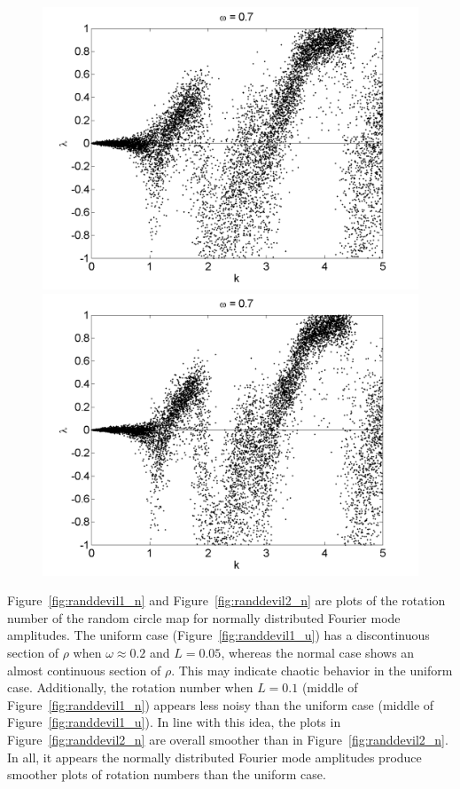 \begin{figure}[!h]
\includegraphics[width=.5\textwidth]{figs/rcirc_n_lyap_L_05_k_10000.png}\hfill
\includegraphics[width=.5\textwidth]{figs/rcirc_n_lyap_L_07_k_10000.png}\\
\end{figure}

Figure~\ref{fig:randdevil1_n} and Figure~\ref{fig:randdevil2_n} are
plots of the rotation number of the random circle map for normally
distributed Fourier mode amplitudes. The uniform case
(Figure~\ref{fig:randdevil1_u}) has a discontinuous section of $\rho$
when $\omega \approx 0.2$ and $L=0.05$, whereas the normal case shows
an almost continuous section of $\rho$. This may indicate chaotic
behavior in the uniform case. Additionally, the rotation number when
$L=0.1$ (middle of Figure~\ref{fig:randdevil1_n}) appears less noisy
than the uniform case (middle of
Figure~\ref{fig:randdevil1_u}). In line with this idea, the plots in
Figure~\ref{fig:randdevil2_n} are overall smoother than in
Figure~\ref{fig:randdevil2_n}. In all, it appears the normally
distributed Fourier mode amplitudes produce smoother plots of rotation
numbers than the uniform case.

